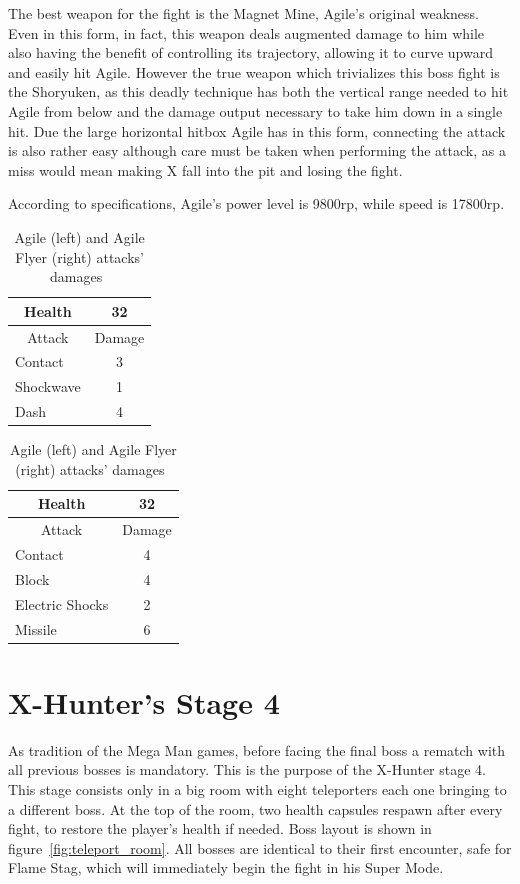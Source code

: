 The best weapon for the fight is the Magnet Mine, Agile's original weakness. Even in this form, in fact, this weapon deals augmented damage to him while also having the benefit of controlling its trajectory, allowing it to curve upward and easily hit Agile. However the true weapon which trivializes this boss fight is the Shoryuken, as this deadly technique has both the vertical range needed to hit Agile from below and the damage output necessary to take him down in a single hit. Due the large horizontal hitbox Agile has in this form, connecting the attack is also rather easy although care must be taken when performing the attack, as a miss would mean making X fall into the pit and losing the fight.

According to specifications, Agile's power level is 9800rp, while speed is 17800rp.


\begin{table}[htp]
	\begin{minipage}{.45\linewidth}
		\centering
		\begin{tabular}[h]{l c }
			\toprule
			\multicolumn{1}{c}{Health}  & 32 \\
			\midrule
			\multicolumn{1}{c}{Attack} & \multicolumn{1}{c}{Damage}\\
			Contact & 3\\
			Shockwave& 1\\
			Dash& 4\\
			\bottomrule
		\end{tabular}
	\end{minipage}
	\begin{minipage}{.45\linewidth}
		\centering
		\begin{tabular}[h]{l c }
			\toprule
			\multicolumn{1}{c}{Health}  & 32 \\
			\midrule
			\multicolumn{1}{c}{Attack} & \multicolumn{1}{c}{Damage}\\
			Contact & 4 \\
			Block & 4\\
			Electric Shocks & 2\\
			Missile& 6\\
			\bottomrule
		\end{tabular}
	\end{minipage}
	\caption{Agile (left) and Agile Flyer (right) attacks' damages~\cite{wiki:Agile}}
\end{table}

\section{X-Hunter's Stage 4}
As tradition of the Mega Man games, before facing the final boss a rematch with all previous bosses is mandatory. This is the purpose of the X-Hunter stage 4. This stage consists only in a big room with eight teleporters each one bringing to a different boss. At the top of the room, two health capsules respawn after every fight, to restore the player's health if needed. Boss layout is shown in figure~\ref{fig:teleport_room}. All bosses are identical to their first encounter, safe for Flame Stag, which will immediately begin the fight in his Super Mode. 

